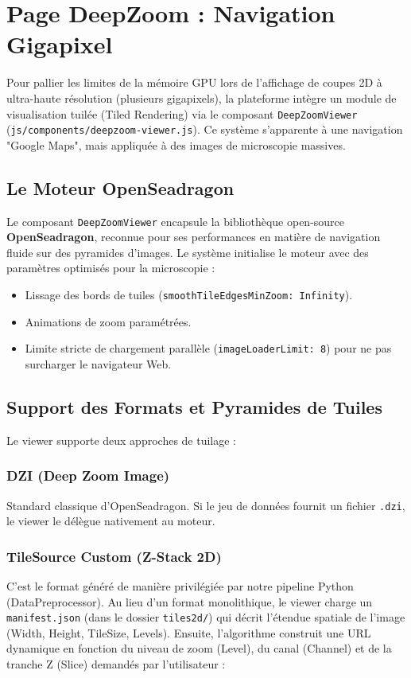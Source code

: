 \chapter{Page DeepZoom : Navigation Gigapixel}
\label{chap:deepzoom}

Pour pallier les limites de la mémoire GPU lors de l'affichage de coupes 2D à ultra-haute résolution (plusieurs gigapixels), la plateforme intègre un module de visualisation tuilée (Tiled Rendering) via le composant \texttt{DeepZoomViewer} (\texttt{js/components/deepzoom-viewer.js}).
Ce système s'apparente à une navigation "Google Maps", mais appliquée à des images de microscopie massives.

\section{Le Moteur OpenSeadragon}
Le composant \texttt{DeepZoomViewer} encapsule la bibliothèque open-source \textbf{OpenSeadragon}, reconnue pour ses performances en matière de navigation fluide sur des pyramides d'images.
Le système initialise le moteur avec des paramètres optimisés pour la microscopie :
\begin{itemize}
    \item Lissage des bords de tuiles (\texttt{smoothTileEdgesMinZoom: Infinity}).
    \item Animations de zoom paramétrées.
    \item Limite stricte de chargement parallèle (\texttt{imageLoaderLimit: 8}) pour ne pas surcharger le navigateur Web.
\end{itemize}

\section{Support des Formats et Pyramides de Tuiles}
Le viewer supporte deux approches de tuilage :

\subsection{DZI (Deep Zoom Image)}
Standard classique d'OpenSeadragon. Si le jeu de données fournit un fichier \texttt{.dzi}, le viewer le délègue nativement au moteur.

\subsection{TileSource Custom (Z-Stack 2D)}
C'est le format généré de manière privilégiée par notre pipeline Python (DataPreprocessor).
Au lieu d'un format monolithique, le viewer charge un \texttt{manifest.json} (dans le dossier \texttt{tiles2d/}) qui décrit l'étendue spatiale de l'image (Width, Height, TileSize, Levels).
Ensuite, l'algorithme construit une URL dynamique en fonction du niveau de zoom (Level), du canal (Channel) et de la tranche Z (Slice) demandés par l'utilisateur :

